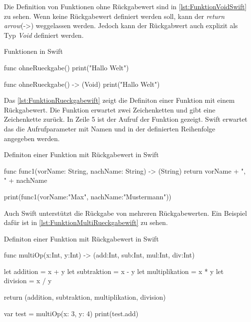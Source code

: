 Die Definition von Funktionen ohne Rückgabewert sind in \autoref{lst:FunktionVoidSwift} zu sehen.
Wenn keine Rückgabewert definiert werden soll, kann der \emph{return arrow}(->) weggelassen werden.
Jedoch kann der Rückgabwert auch explizit als Typ \emph{Void} definiert werden.

\begin{listing}[H]
\caption{Funktionen in Swift}
\label{lst:FunktionVoidSwift}
\begin{SwiftCode}
func ohneRueckgabe() {
    print("Hallo Welt")
}

func ohneRueckgabe() -> (Void) {
    print("Hallo Welt")
}
\end{SwiftCode}
\end{listing}

Das \autoref{lst:FunktionRueckgabewift} zeigt die Definiton einer Funktion mit einem Rückgabewert. 
Die Funktion erwartet zwei Zeichenketten und gibt eine Zeichenkette zurück.
In Zeile 5 ist der Aufruf der Funktion gezeigt. 
Swift erwartet das die Aufrufparameter mit Namen und in der definierten Reihenfolge angegeben werden.

\begin{listing}
\caption{Definiton einer Funktion mit Rückgabewert in Swift}
\label{lst:FunktionRueckgabewift}
\begin{SwiftCode}
func func1(vorName: String, nachName: String) -> (String){
    return vorName + ", " + nachName
}

print(func1(vorName:"Max", nachName:"Mustermann"))
\end{SwiftCode}
\end{listing}

Auch Swift unterstützt die Rückgabe von mehreren Rückgabewerten.
Ein Beispiel dafür ist in \autoref{lst:FunktionMultiRueckgabewift} zu sehen. 

\begin{listing}
\caption{Definiton einer Funktion mit Rückgabewert in Swift}
\label{lst:FunktionMultiRueckgabewift}
\begin{SwiftCode}
func multiOp(x:Int, y:Int) -> (add:Int, sub:Int, mul:Int, div:Int){
    let addition = x + y
    let subtraktion = x - y
    let multiplikation = x * y
    let division = x / y
	
    return (addition, subtraktion, multiplikation, division)
}

var test = multiOp(x: 3, y: 4)
print(test.add)
\end{SwiftCode}
\end{listing}

